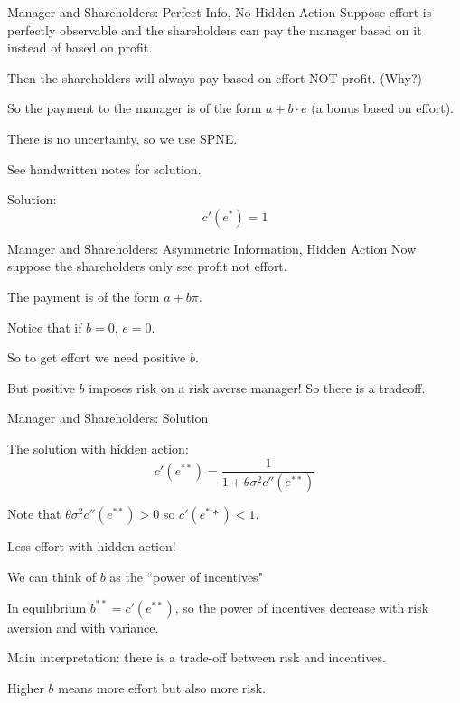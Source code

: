 \documentclass[aspectratio=169]{beamer}
\newenvironment{wideitemize}{\itemize\addtolength{\itemsep}{10pt}}{\enditemize}
\begin{document}
\begin{frame}{Manager and Shareholders: Perfect Info, No Hidden Action}
Suppose effort is perfectly observable and the shareholders can pay the manager based on it instead of based on profit.

\begin{wideitemize}
    \item Then the shareholders will always pay based on effort NOT profit. (Why?)
    \item So the payment to the manager is of the form $a+b\cdot e$ (a bonus based on effort).
    \item There is no uncertainty, so we use SPNE.
    \item See handwritten notes for solution. \pause 
    \item Solution:
    \[c'(e^*)=1\]
\end{wideitemize}
    
\end{frame}

\begin{frame}{Manager and Shareholders: Asymmetric Information, Hidden Action}
Now suppose the shareholders only see profit not effort.
\begin{wideitemize}
    \item The payment is of the form $a+b\pi $.
    \item Notice that if $b=0$, $e=0$.
    \item So to get effort we need positive $b$.
    \item But positive $b$ imposes risk on a risk averse manager! So there is a tradeoff.
\end{wideitemize}
    
\end{frame}



\begin{frame}{Manager and Shareholders: Solution}
\begin{wideitemize}
    \item The solution with hidden action:
\[c'(e^{**}) = \frac{1}{1+\theta \sigma^2 c''(e^{**})}\]
\item Note that $\theta \sigma^2 c''(e^{**})>0$ so $c'(e^**)<1$.
\item Less effort with hidden action!
\item We can think of $b$ as the ``power of incentives"
\item In equilibrium $b^{**}=c'(e^{**})$, so the power of incentives decrease with risk aversion and with variance.
\item Main interpretation: there is a trade-off between risk and incentives.
\item Higher $b$ means more effort but also more risk.

\end{wideitemize}

    
\end{frame}
\end{document}
